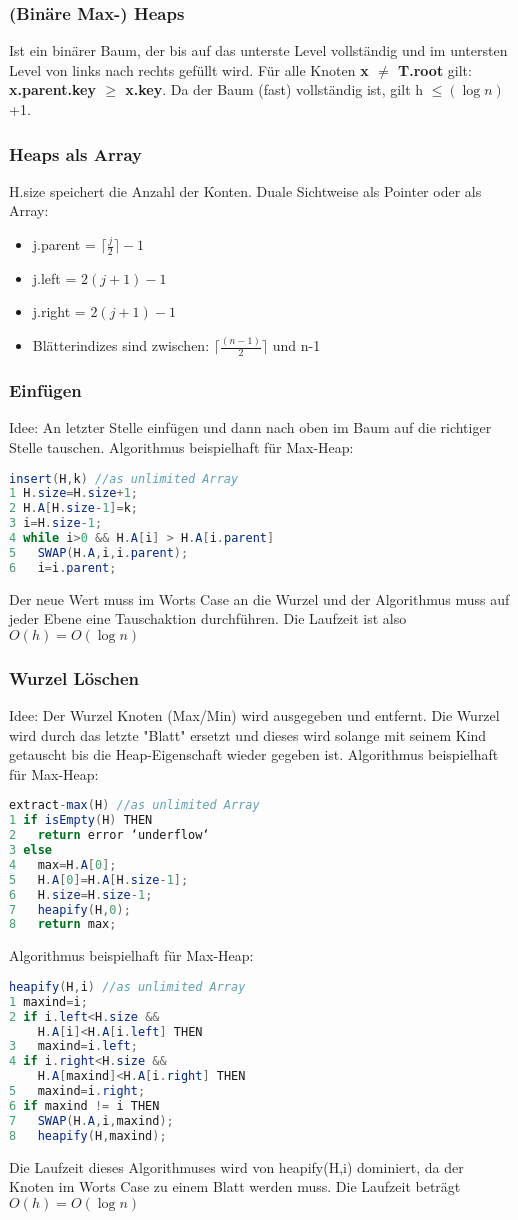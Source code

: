 \documentclass[jou,apacite]{apa6}
\begin{document}
\subsubsection{(Binäre Max-) Heaps}
Ist ein binärer Baum, der bis auf das unterste Level vollständig und im untersten Level von links nach rechts gefüllt wird. Für alle Knoten {\bfseries x $\neq$ T.root} gilt: {\bfseries x.parent.key $\geq$ x.key}. Da der Baum (fast) vollständig ist, gilt  h $\leq (\log n)$+1.
\subsubsection{Heaps als Array}
H.size speichert die Anzahl der Konten.
Duale Sichtweise als Pointer oder als Array:
\begin{itemize}
    \item j.parent = $\lceil{}\frac{j}{2}\rceil -1$
    \item j.left = $2(j+1) - 1$
    \item j.right = $2(j+1) -1$
    \item Blätterindizes sind zwischen: $\lceil{}\frac{(n-1)}{2}\rceil$ und n-1
\end{itemize}

\subsubsection{Einfügen}
Idee: An letzter Stelle einfügen und dann nach oben im Baum auf die richtiger Stelle tauschen.
Algorithmus beispielhaft für Max-Heap:
\begin{lstlisting}[language=java]
insert(H,k) //as unlimited Array
1 H.size=H.size+1;
2 H.A[H.size-1]=k;
3 i=H.size-1;
4 while i>0 && H.A[i] > H.A[i.parent]
5   SWAP(H.A,i,i.parent);
6   i=i.parent;
\end{lstlisting}
Der neue Wert muss im Worts Case an die Wurzel und der Algorithmus muss auf jeder Ebene eine Tauschaktion durchführen. Die Laufzeit ist also $O(h) = O(\log n)$ 
\subsubsection{Wurzel Löschen}
Idee: Der Wurzel Knoten (Max/Min) wird ausgegeben und entfernt. Die Wurzel wird durch das letzte "Blatt" ersetzt und dieses wird solange mit seinem Kind getauscht bis die Heap-Eigenschaft wieder gegeben ist. 
Algorithmus beispielhaft für Max-Heap:
\begin{lstlisting}[language=java]
extract-max(H) //as unlimited Array
1 if isEmpty(H) THEN
2   return error ‘underflow‘
3 else
4   max=H.A[0];
5   H.A[0]=H.A[H.size-1];
6   H.size=H.size-1;
7   heapify(H,0);
8   return max;
\end{lstlisting}
Algorithmus beispielhaft für Max-Heap:
\begin{lstlisting}[language=java]
heapify(H,i) //as unlimited Array
1 maxind=i;
2 if i.left<H.size && 
    H.A[i]<H.A[i.left] THEN
3   maxind=i.left;
4 if i.right<H.size && 
    H.A[maxind]<H.A[i.right] THEN
5   maxind=i.right;
6 if maxind != i THEN
7   SWAP(H.A,i,maxind);
8   heapify(H,maxind);
\end{lstlisting}
Die Laufzeit dieses Algorithmuses wird von heapify(H,i) dominiert, da der Knoten im Worts Case zu einem Blatt werden muss. Die Laufzeit beträgt $O(h) = O(\log n)$
\end{document}
